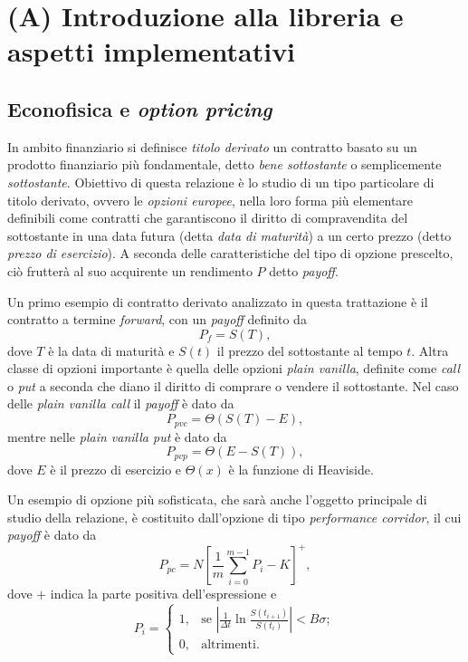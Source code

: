 \chapter{(A) Introduzione alla libreria e aspetti implementativi}
\section{Econofisica e \textit{option pricing}}
In ambito finanziario si definisce \textit{titolo derivato} un contratto basato su un prodotto finanziario più fondamentale, detto \textit{bene sottostante} o semplicemente \textit{sottostante}. Obiettivo di questa relazione è lo studio di un tipo particolare di titolo derivato, ovvero le \textit{opzioni europee}, nella loro forma più elementare definibili come contratti che garantiscono il diritto di compravendita del sottostante in una data futura (detta \textit{data di maturità}) a un certo prezzo (detto \textit{prezzo di esercizio}). A seconda delle caratteristiche del tipo di opzione prescelto, ciò frutterà al suo acquirente un rendimento $P$ detto \textit{payoff}.

Un primo esempio di contratto derivato analizzato in questa trattazione è il contratto a termine \textit{forward}, con un \textit{payoff} definito da
\begin{equation}
    P_f = S(T),
    \label{eq:forward_payoff}
\end{equation}
dove $T$ è la data di maturità e $S(t)$ il prezzo del sottostante al tempo $t$. Altra classe di opzioni importante è quella delle opzioni \textit{plain vanilla}, definite come \textit{call} o \textit{put} a seconda che diano il diritto di comprare o vendere il sottostante. Nel caso delle \textit{plain vanilla call} il \textit{payoff} è dato da
\begin{equation}
    P_{pvc} = \Theta(S(T)-E),
    \label{eq:pvc_payoff}
\end{equation}
mentre nelle \textit{plain vanilla put} è dato da
\begin{equation}
    P_{pvp} = \Theta(E-S(T)),
    \label{eq:pvp_payoff}
\end{equation}
dove $E$ è il prezzo di esercizio e $\Theta(x)$ è la funzione di Heaviside.

Un esempio di opzione più sofisticata, che sarà anche l'oggetto principale di studio della relazione, è costituito dall'opzione di tipo \textit{performance corridor}, il cui \textit{payoff} è dato da
\begin{equation}
    P_{pc} = N\left[ \frac{1}{m} \sum_{i=0}^{m-1}{P_i} - K \right]^+,
    \label{eq:performancecorridor_payoff}
\end{equation}
dove $+$ indica la parte positiva dell'espressione e
\begin{equation}
    P_i = \begin{cases}
    1, & \text{se} \,\,\left| \frac{1}{\Delta t} \ln{\frac{S(t_{i+1})}{S(t_i)}} \right| < B \sigma;\\
    0, & \text{altrimenti}.
  \end{cases}
    \label{eq:performancecorridor_barrier}
\end{equation}

